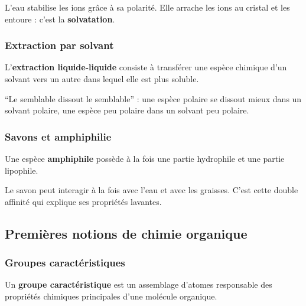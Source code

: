 \documentclass[11pt,a4paper]{article}
\begin{document}
\begin{sensbox}
L'eau stabilise les ions grâce à sa polarité.  
Elle arrache les ions au cristal et les entoure : c'est la \textbf{solvatation}.
\end{sensbox}

\subsubsection{Extraction par solvant}

\begin{definitionbox}
L'\textbf{extraction liquide-liquide} consiste à transférer une espèce chimique d'un solvant vers un autre dans lequel elle est plus soluble.
\end{definitionbox}

\begin{sensbox}
``Le semblable dissout le semblable'' : une espèce polaire se dissout mieux dans un solvant polaire, une espèce peu polaire dans un solvant peu polaire.
\end{sensbox}

\subsubsection{Savons et amphiphilie}

\begin{definitionbox}
Une espèce \textbf{amphiphile} possède à la fois une partie hydrophile et une partie lipophile.
\end{definitionbox}

\begin{sensbox}
Le savon peut interagir à la fois avec l'eau et avec les graisses.  
C'est cette double affinité qui explique ses propriétés lavantes.
\end{sensbox}

\subsection{Premières notions de chimie organique}

\subsubsection{Groupes caractéristiques}

\begin{definitionbox}
Un \textbf{groupe caractéristique} est un assemblage d'atomes responsable des propriétés chimiques principales d'une molécule organique.
\end{definitionbox}
\end{document}
